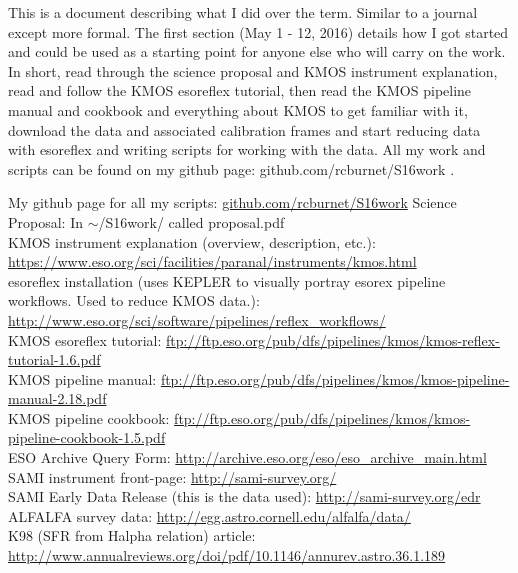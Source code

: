 \documentclass[10pt,letterpaper]{article}
\begin{document}
This is a document describing what I did over the term. Similar to a journal except more formal. The first section (May 1 - 12, 2016) details how I got started and could be used as a starting point for anyone else who will carry on the work. In short, read through the science proposal and KMOS instrument explanation, read and follow the KMOS esoreflex tutorial, then read the KMOS pipeline manual and cookbook and everything about KMOS to get familiar with it, download the data and associated calibration frames and start reducing data with esoreflex and writing scripts for working with the data. All my work and scripts can be found on my github page: github.com/rcburnet/S16work .
\begin{thebibliography}{1}
My github page for all my scripts: \url{github.com/rcburnet/S16work}
Science Proposal: In $\sim$/S16work/ called proposal.pdf\\
KMOS instrument explanation (overview, description, etc.): \url{https://www.eso.org/sci/facilities/paranal/instruments/kmos.html}\\
esoreflex installation (uses KEPLER to visually portray esorex pipeline workflows. Used to reduce KMOS data.): \url{http://www.eso.org/sci/software/pipelines/reflex_workflows/}\\
KMOS esoreflex tutorial: \url{ftp://ftp.eso.org/pub/dfs/pipelines/kmos/kmos-reflex-tutorial-1.6.pdf}\\
KMOS pipeline manual: \url{ftp://ftp.eso.org/pub/dfs/pipelines/kmos/kmos-pipeline-manual-2.18.pdf}\\
KMOS pipeline cookbook: \url{ftp://ftp.eso.org/pub/dfs/pipelines/kmos/kmos-pipeline-cookbook-1.5.pdf}\\
ESO Archive Query Form: \url{http://archive.eso.org/eso/eso_archive_main.html}
SAMI instrument front-page: \url{http://sami-survey.org/}\\
SAMI Early Data Release (this is the data used): \url{http://sami-survey.org/edr}\\
ALFALFA survey data: \url{http://egg.astro.cornell.edu/alfalfa/data/}\\
K98 (SFR from Halpha relation) article: \url{http://www.annualreviews.org/doi/pdf/10.1146/annurev.astro.36.1.189}\\

\end{thebibliography}
\end{document}
